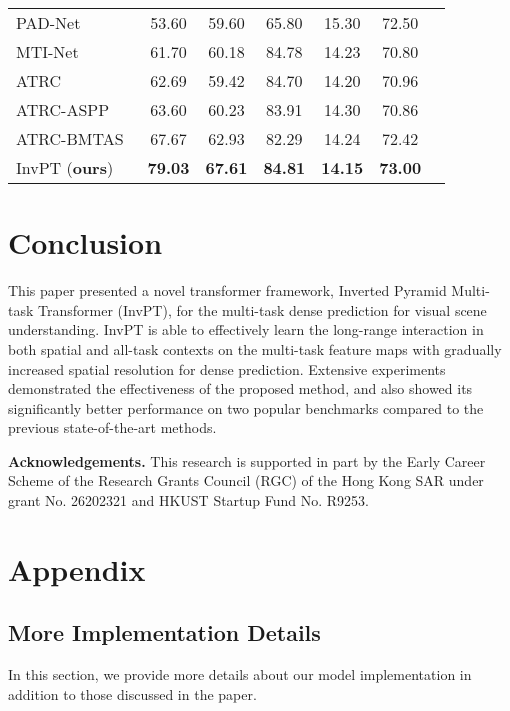 \documentclass[runningheads]{llncs}
\begin{document}
\begin{table}[t]
\begin{minipage}[c]{\textwidth}
\begin{subtable}[t]{0.531\textwidth}
{{\begin{tabular}{lcccccc}
    PAD-Net~\cite{padnet} & 53.60 & 59.60 & 65.80 & 15.30 & 72.50 \\
    MTI-Net~\cite{mti}  &  61.70 & 60.18 & 84.78 & 14.23 & 70.80\\
    ATRC~\cite{atrc}  & 62.69 & 59.42 & 84.70 & 14.20 & 70.96\\
    ATRC-ASPP~\cite{atrc}  & 63.60 & 60.23 & 83.91 & 14.30 & 70.86\\
    ATRC-BMTAS~\cite{atrc}  & 67.67 & 62.93 & 82.29 & 14.24 & 72.42\\
    InvPT (\textbf{ours}) & \textbf{79.03} & \textbf{67.61} & \textbf{84.81} & \textbf{14.15} & \textbf{73.00}\\
    \bottomrule
    \end{tabular}}}
    \label{tab:sota_pascal}
\end{subtable}
\end{minipage}
\vspace{-20pt}
\end{table}

\section{Conclusion}
This paper presented a novel transformer framework, Inverted Pyramid Multi-task Transformer (InvPT), for the multi-task  dense prediction for visual scene understanding.
InvPT is able to effectively learn the long-range interaction in both spatial and all-task contexts on the multi-task feature maps with gradually increased spatial resolution for dense prediction.
Extensive experiments demonstrated the effectiveness of the proposed method, and also showed its significantly better performance on two popular benchmarks compared to the previous state-of-the-art methods.

\par \noindent \textbf{Acknowledgements.}
This research is supported in part by the Early Career Scheme of the Research Grants Council (RGC) of the Hong Kong SAR under grant No. 26202321 and HKUST Startup Fund No. R9253.



\clearpage


\clearpage

\appendix
\section{Appendix}
\subsection{More Implementation Details}
In this section, we provide more details about our model implementation in addition to those discussed in the paper. 
\end{document}
